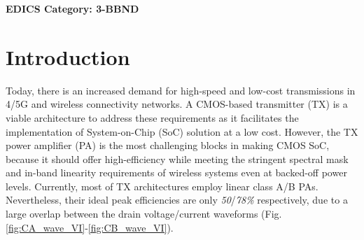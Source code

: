 \documentclass[conference]{IEEEtran}
\begin{document}
\ifCLASSOPTIONpeerreview
\begin{center} \bfseries EDICS Category: 3-BBND \end{center}
\fi

\IEEEpeerreviewmaketitle

\section{Introduction}
\color{blue} Today, \color{black} there is an increased demand for high-speed \color{blue} and low-cost transmissions in 4/5G and wireless connectivity \color{black} networks. \color{blue} A CMOS-based transmitter (TX) is a viable architecture to address these requirements as it facilitates the implementation of System-on-Chip (SoC) solution at a low cost. However, the TX power amplifier (PA) is the most challenging blocks \color{black}  in making CMOS SoC, because \color{blue} it should offer \color{black} high-efficiency \color{blue} while meeting the stringent spectral mask  and in-band linearity requirements of wireless systems \color{black} even at backed-off power levels. Currently, \color{blue} most of TX architectures employ linear class A/B PAs. Nevertheless, their ideal \color{black} peak efficiencies are only \color{blue}\textit{50}/\textit{78\%} \color{black} respectively, due to \color{blue} a \color{black} large overlap between the drain voltage\color{blue}/\color{black}current \color{blue}  waveforms (Fig.\ref{fig:CA_wave_VI}-\ref{fig:CB_wave_VI}). \color{black}
\end{document}
